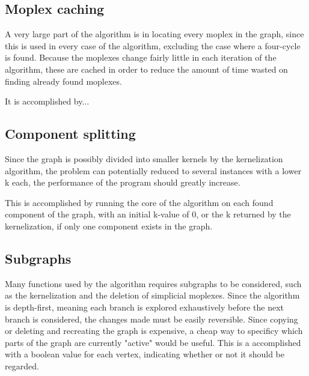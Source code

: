 \documentclass{article}
\begin{document}
		\subsection{Moplex caching}
		A very large part of the algorithm is in locating every moplex in the graph, since this is used in every case of the algorithm, excluding the case where a four-cycle is found.
		Because the moplexes change fairly little in each iteration of the algorithm, these are cached in order to reduce the amount of time wasted on finding already found moplexes.

		It is accomplished by...

		\subsection{Component splitting}
		Since the graph is possibly divided into smaller kernels by the kernelization algorithm, the problem can potentially reduced to several instances with a lower k each, the performance of the program should greatly increase.

		This is accomplished by running the core of the algorithm on each found component of the graph, with an initial k-value of 0, or the k returned by the kernelization, if only one component exists in the graph.

		\subsection{Subgraphs}
		Many functions used by the algorithm requires subgraphs to be considered, such as the kernelization and the deletion of simplicial moplexes.
		Since the algorithm is depth-first, meaning each branch is explored exhaustively before the next branch is considered, the changes made must be easily reversible.
		Since copying or deleting and recreating the graph is expensive, a cheap way to specificy which parts of the graph are currently "active" would be useful.
		This is a accomplished with a boolean value for each vertex, indicating whether or not it should be regarded.
\end{document}
